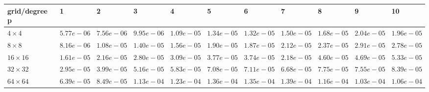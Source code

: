 \begin{tabular}{lllllllllll}
\hline
 grid/degree p   & 1          & 2          & 3          & 4          & 5          & 6          & 7          & 8          & 9          & 10         \\
\hline
 $4 \times 4$    & $5.77e-06$ & $7.56e-06$ & $9.95e-06$ & $1.09e-05$ & $1.34e-05$ & $1.32e-05$ & $1.50e-05$ & $1.68e-05$ & $2.04e-05$ & $1.96e-05$ \\
 $8 \times 8$    & $8.16e-06$ & $1.08e-05$ & $1.40e-05$ & $1.56e-05$ & $1.90e-05$ & $1.87e-05$ & $2.12e-05$ & $2.37e-05$ & $2.91e-05$ & $2.78e-05$ \\
 $16 \times 16$  & $1.61e-05$ & $2.16e-05$ & $2.80e-05$ & $3.09e-05$ & $3.77e-05$ & $3.74e-05$ & $2.18e-05$ & $4.60e-05$ & $4.69e-05$ & $5.33e-05$ \\
 $32 \times 32$  & $2.95e-05$ & $3.99e-05$ & $5.16e-05$ & $5.83e-05$ & $7.08e-05$ & $7.11e-05$ & $6.68e-05$ & $7.75e-05$ & $7.55e-05$ & $8.39e-05$ \\
 $64 \times 64$  & $6.39e-05$ & $8.49e-05$ & $1.13e-04$ & $1.23e-04$ & $1.36e-04$ & $1.35e-04$ & $1.39e-04$ & $1.16e-04$ & $1.03e-04$ & $1.06e-04$ \\
\hline
\end{tabular}